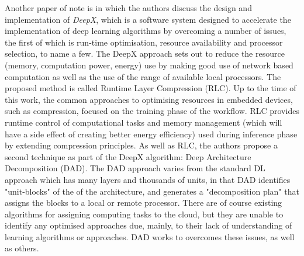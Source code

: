 \documentclass[conference]{IEEEtran}
\begin{document}
Another paper of note is \cite{Lane2016} in which the authors discuss the design and implementation of \textit{DeepX}, which is a software system designed to accelerate the implementation of deep learning algorithms by overcoming a number of issues, the first of which is run-time optimisation, resource availability and processor selection, to name a few. The DeepX approach sets out to reduce the resource (memory, computation power, energy) use by making good use of network based computation as well as the use of the range of available local processors. The proposed method is called Runtime Layer Compression (RLC). Up to the time of this work, the common approaches to optimising resources in embedded devices, such as compression, focused on the training phase of the workflow. RLC provides runtime control of computational tasks and memory management (which will have a side effect of creating better energy efficiency) used during inference phase by extending compression principles. As well as RLC, the authors propose a second technique as part of the DeepX algorithm: Deep Architecture Decomposition (DAD). The DAD approach varies from the standard DL approach which has many layers and thousands of units, in that DAD identifies "unit-blocks" of the of the architecture, and generates a "decomposition plan" that assigns the blocks to a local or remote processor. There are of course existing algorithms for assigning computing tasks to the cloud, but they are unable to identify any optimised approaches due, mainly, to their lack of understanding of learning algorithms or approaches. DAD works to overcomes these issues, as well as others.
\end{document}
